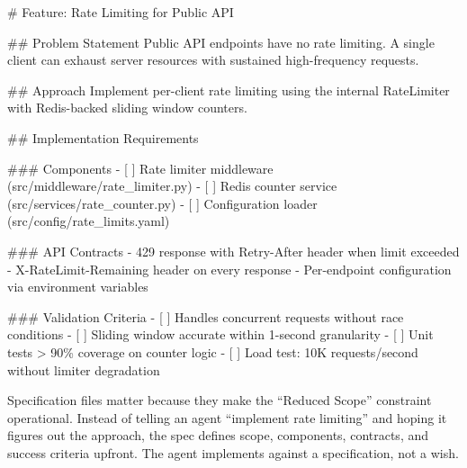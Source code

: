 \documentclass[
  a4paper,
  DIV=11,
  numbers=noendperiod]{scrreprt}
\newenvironment{Shaded}{\begin{snugshade}}{\end{snugshade}}
\newcommand{\FunctionTok}[1]{\textcolor[rgb]{0.28,0.35,0.67}{#1}}
\newcommand{\InformationTok}[1]{\textcolor[rgb]{0.37,0.37,0.37}{#1}}
\newcommand{\NormalTok}[1]{\textcolor[rgb]{0.00,0.23,0.31}{#1}}
\newcommand{\SpecialStringTok}[1]{\textcolor[rgb]{0.13,0.47,0.30}{#1}}
\newcommand{\VariableTok}[1]{\textcolor[rgb]{0.07,0.07,0.07}{#1}}
\begin{document}
\begin{Shaded}
\begin{Highlighting}[]
\FunctionTok{\# Feature: Rate Limiting for Public API}

\FunctionTok{\#\# Problem Statement}
\NormalTok{Public API endpoints have no rate limiting. A single client can}
\NormalTok{exhaust server resources with sustained high{-}frequency requests.}

\FunctionTok{\#\# Approach}
\NormalTok{Implement per{-}client rate limiting using the internal RateLimiter}
\NormalTok{with Redis{-}backed sliding window counters.}

\FunctionTok{\#\# Implementation Requirements}

\FunctionTok{\#\#\# Components}
\SpecialStringTok{{-} }\VariableTok{[ ]}\NormalTok{ Rate limiter middleware (}\InformationTok{\textasciigrave{}src/middleware/rate\_limiter.py\textasciigrave{}}\NormalTok{)}
\SpecialStringTok{{-} }\VariableTok{[ ]}\NormalTok{ Redis counter service (}\InformationTok{\textasciigrave{}src/services/rate\_counter.py\textasciigrave{}}\NormalTok{)}
\SpecialStringTok{{-} }\VariableTok{[ ]}\NormalTok{ Configuration loader (}\InformationTok{\textasciigrave{}src/config/rate\_limits.yaml\textasciigrave{}}\NormalTok{)}

\FunctionTok{\#\#\# API Contracts}
\SpecialStringTok{{-} }\NormalTok{429 response with }\InformationTok{\textasciigrave{}Retry{-}After\textasciigrave{}}\NormalTok{ header when limit exceeded}
\SpecialStringTok{{-} }\InformationTok{\textasciigrave{}X{-}RateLimit{-}Remaining\textasciigrave{}}\NormalTok{ header on every response}
\SpecialStringTok{{-} }\NormalTok{Per{-}endpoint configuration via environment variables}

\FunctionTok{\#\#\# Validation Criteria}
\SpecialStringTok{{-} }\VariableTok{[ ]}\NormalTok{ Handles concurrent requests without race conditions}
\SpecialStringTok{{-} }\VariableTok{[ ]}\NormalTok{ Sliding window accurate within 1{-}second granularity}
\SpecialStringTok{{-} }\VariableTok{[ ]}\NormalTok{ Unit tests \textgreater{} 90\% coverage on counter logic}
\SpecialStringTok{{-} }\VariableTok{[ ]}\NormalTok{ Load test: 10K requests/second without limiter degradation}
\end{Highlighting}
\end{Shaded}

Specification files matter because they make the ``Reduced Scope''
constraint operational. Instead of telling an agent ``implement rate
limiting'' and hoping it figures out the approach, the spec defines
scope, components, contracts, and success criteria upfront. The agent
implements against a specification, not a wish.
\end{document}
